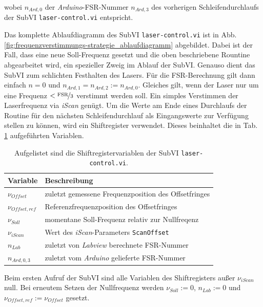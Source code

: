 wobei $n_{Ard,0}$ der \textit{Arduino}-FSR-Nummer $n_{Ard,3}$ des vorherigen
Schleifendurchlaufs der SubVI \lstinline|laser-control.vi| entspricht.\par
Das komplette Ablaufdiagramm des SubVI \lstinline|laser-control.vi| ist in Abb.
\ref{fig:frequenzverstimmungs-strategie_ablaufdiagramm} abgebildet. Dabei ist
der Fall, dass eine neue Soll-Frequenz gesetzt und die oben beschriebene
Rountine abgearbeitet wird, ein spezieller Zweig im Ablauf der SubVI. Genauso
dient das SubVI zum schlichten Festhalten des Lasers. Für die FSR-Berechnung
gilt dann einfach $n=0$ und $n_{Ard,1}=n_{Ard,2}:=n_{Ard,0}$. Gleiches gilt,
wenn der Laser nur um eine Frequenz $<\nicefrac{\text{FSR}}{3}$ verstimmt werden
soll. Ein simples Verstimmen der Laserfrequenz via \textit{iScan} genügt. Um die
Werte am Ende eines Durchlaufs der Routine für den nächsten Schleifendurchlauf
als Eingangswerte zur Verfügung stellen zu können, wird ein Shiftregister
verwendet.
Dieses beinhaltet die in Tab.
\ref{tab:shiftregister_laserkontrolle} aufgeführten Variablen.
\begin{table}
	\begin{tabular}{p{}p{}}
		\toprule
			Variable & Beschreibung \\
		\midrule[1px]
		\hline
			$\nu_{Offset}$ & zuletzt gemessene Frequenzposition des Offsetfringes\\
			$\nu_{Offset,ref}$ & Referenzfrequenzposition des Offsetfringes\\
			$\nu_{Soll}$ & momentane Soll-Frequenz relativ zur Nullfreqenz\\
			$\nu_{iScan}$ & Wert des \textit{iScan}-Parameters \lstinline|ScanOffset|\\
			$n_{Lab}$ & zuletzt von \textit{Labview} berechnete FSR-Nummer\\
			$n_{Ard,0,3}$ & zuletzt vom \textit{Arduino} gelieferte FSR-Nummer\\
		\bottomrule[1px]
	\end{tabular}
	\caption[Shiftregister -
	\lstinline|laser-control.vi|]{Aufgelistet sind die Shiftregistervariablen der
	SubVI \lstinline|laser-control.vi|.}
	\label{tab:shiftregister_laserkontrolle}
\end{table}
Beim ersten Aufruf der SubVI sind alle Variablen des Shiftregisters außer
$\nu_{iScan}$ null. Bei erneutem Setzen der Nullfrequenz werden $\nu_{Soll}:=0$,
$n_{Lab}:=0$ und $\nu_{Offset,ref}:=\nu_{Offset}$ gesetzt.\par
